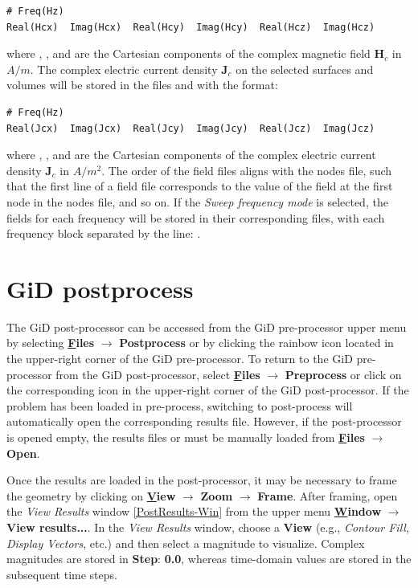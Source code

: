 \begin{small}\begin{lstlisting}
# Freq(Hz)
Real(Hcx)  Imag(Hcx)  Real(Hcy)  Imag(Hcy)  Real(Hcz)  Imag(Hcz)
\end{lstlisting}\end{small} 
where , , and  are the Cartesian components of the complex magnetic field $\mathbf{H}_{c}$ in $A/m$. The complex electric current density $\mathbf{J}_{c}$ on the selected surfaces and volumes will be stored in the files  and  with the format:
\begin{small}\begin{lstlisting}
# Freq(Hz)
Real(Jcx)  Imag(Jcx)  Real(Jcy)  Imag(Jcy)  Real(Jcz)  Imag(Jcz)
\end{lstlisting}\end{small} 
where , , and  are the Cartesian components of the complex electric current density $\mathbf{J}_{c}$ in $A/m^{2}$. The order of the field files aligns with the nodes file, such that the first line of a field file corresponds to the value of the field at the first node in the nodes file, and so on. If the \emph{Sweep frequency mode} is selected, the fields for each frequency will be stored in their corresponding files, with each frequency block separated by the line: . 

\section{GiD postprocess}\label{GiDPostProcess}

The GiD post-processor can be accessed from the GiD pre-processor upper menu by selecting \textbf{\underline{F}iles} $\rightarrow$ \textbf{Postprocess} or by clicking the rainbow icon located in the upper-right corner of the GiD pre-processor. To return to the GiD pre-processor from the GiD post-processor, select \textbf{\underline{F}iles} $\rightarrow$ \textbf{Preprocess} or click on the corresponding icon in the upper-right corner of the GiD post-processor. If the problem has been loaded in pre-process, switching to post-process will automatically open the corresponding results file. However, if the post-processor is opened empty, the results files  or  must be manually loaded from \textbf{\underline{F}iles} $\rightarrow$ \textbf{Open}.

Once the results are loaded in the post-processor, it may be necessary to frame the geometry by clicking on \textbf{\underline{V}iew} $\rightarrow$ \textbf{Zoom} $\rightarrow$ \textbf{Frame}. After framing, open the \textit{View Results} window \ref{PostResults-Win} from the upper menu \textbf{\underline{W}indow} $\rightarrow$ \textbf{View results...}. In the \textit{View Results} window, choose a \textbf{View} (e.g., \textit{Contour Fill}, \textit{Display Vectors}, etc.) and then select a magnitude to visualize. Complex magnitudes are stored in \textbf{Step}: \textbf{0.0}, whereas time-domain values are stored in the subsequent time steps.

